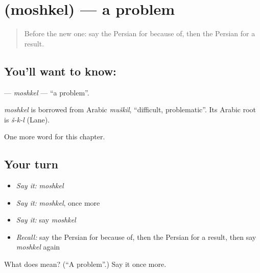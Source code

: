 \section[\texorpdfstring{\fa{مشکل} (moshkel)}{مشکل (moshkel)}]{ (moshkel) — a problem}

\label{lesson:FA-C158-moshkel}



\begin{quote}
Before the new one: say the Persian for because of, then the Persian for a result.
\end{quote}

\subsection*{You'll want to know: }
\textbf{} — \emph{moshkel} — \textquotedblleft{}a problem\textquotedblright{}.

\begin{cousinweb}
\emph{moshkel} is borrowed from Arabic \emph{muškil}, \textquotedblleft{}difficult, problematic\textquotedblright{}. Its Arabic root is \emph{š-k-l} (Lane).
\end{cousinweb}

\begin{grammarlens}[title={What you've built}]
One more word for this chapter.
\end{grammarlens}

\subsection*{Your turn}
\begin{itemize}
\raggedright
  \item \emph{Say it:} \emph{moshkel}
  \item \emph{Say it:} \emph{moshkel}, once more
  \item \emph{Say it:} say \emph{moshkel}
  \item \emph{Recall:} say the Persian for because of, then the Persian for a result, then say \emph{moshkel} again
\end{itemize}

\begin{tcolorbox}[breakable,colback=teal!4,colframe=teal!35!black,title={Before you move on}]
What does  mean? (\textquotedblleft{}A problem\textquotedblright{}.) Say it once more.
\end{tcolorbox}
